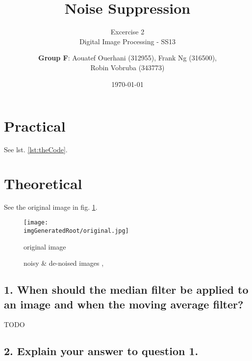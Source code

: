 \documentclass[a4paper,headings=small]{scrartcl}
\title{Noise Suppression}
\subtitle{Excercise 2 \\ Digital Image Processing - SS13}
\author{\textbf{Group F}: Aouatef Ouerhani (312955), Frank Ng (316500),\\ Robin Vobruba (343773)}
\date{\today}
\numberwithin{equation}{section} %
\numberwithin{figure}{section}   %
\newcommand{\imgGeneratedRoot}{../../../target}
\begin{document}
\maketitle

\section{Practical}

See lst. \ref{lst:theCode}.


\section{Theoretical}

See the original image in fig. \ref{fig:original}.

\begin{figure}[htbp]
	\centering
	\texttt{[image: \\imgGeneratedRoot/original.jpg]}
	\caption{original image}
	\label{fig:original}
\end{figure}

\begin{figure}[ht]
	\centering



	\caption[Optional caption for list of figures]{
		noisy \& de-noised images , 
	}
	\label{fig:noiseAndRestored}
\end{figure}


\subsection{1. When should the median filter be applied to an image and when the moving average filter?}

TODO

\subsection{2. Explain your answer to question 1.}
\end{document}
